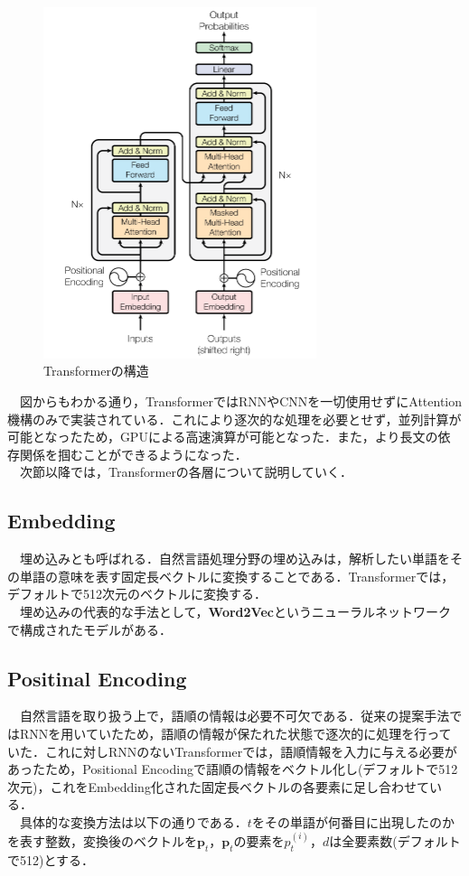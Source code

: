 \documentclass[a4j, 11pt]{jsarticle}
\numberwithin{equation}{section}
\begin{document}
\begin{figure}[H]
\centering
\includegraphics[width=8cm]{transformer_model.png}
\caption{Transformerの構造}
\label{tra_model}
\end{figure}

　図からもわかる通り，TransformerではRNNやCNNを一切使用せずにAttention機構のみで実装されている．これにより逐次的な処理を必要とせず，並列計算が可能となったため，GPUによる高速演算が可能となった．また，より長文の依存関係を掴むことができるようになった．\\
　次節以降では，Transformerの各層について説明していく．
\subsection{Embedding}
　埋め込みとも呼ばれる．自然言語処理分野の埋め込みは，解析したい単語をその単語の意味を表す固定長ベクトルに変換することである．Transformerでは，デフォルトで512次元のベクトルに変換する．\\
　埋め込みの代表的な手法として，\textbf{Word2Vec}というニューラルネットワークで構成されたモデルがある．
　
\subsection{Positinal Encoding}
　自然言語を取り扱う上で，語順の情報は必要不可欠である．従来の提案手法ではRNNを用いていたため，語順の情報が保たれた状態で逐次的に処理を行っていた．これに対しRNNのないTransformerでは，語順情報を入力に与える必要があったため，Positional Encodingで語順の情報をベクトル化し(デフォルトで512次元)，これをEmbedding化された固定長ベクトルの各要素に足し合わせている．\\
　具体的な変換方法は以下の通りである．$t$をその単語が何番目に出現したのかを表す整数，変換後のベクトルを$\mathbf{p}_t$，$\mathbf{p}_t$の要素を$p_t^{(i)}$，$d$は全要素数(デフォルトで512)とする．\\
\end{document}
